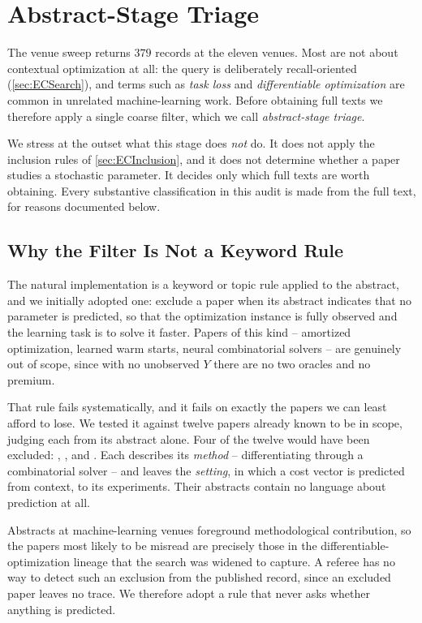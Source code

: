 \section{Abstract-Stage Triage}
\label{sec:ECTriage}

The venue sweep returns \(379\) records at the eleven venues. Most are not about contextual
optimization at all: the query is deliberately recall-oriented (\cref{sec:ECSearch}), and terms such
as \emph{task loss} and \emph{differentiable optimization} are common in unrelated machine-learning
work. Before obtaining full texts we therefore apply a single coarse filter, which we call
\emph{abstract-stage triage}.

We stress at the outset what this stage does \emph{not} do. It does not apply the inclusion rules of
\cref{sec:ECInclusion}, and it does not determine whether a paper studies a stochastic parameter. It
decides only which full texts are worth obtaining. Every substantive classification in this audit is
made from the full text, for reasons documented below.

\subsection{Why the Filter Is Not a Keyword Rule}

The natural implementation is a keyword or topic rule applied to the abstract, and we initially
adopted one: exclude a paper when its abstract indicates that no parameter is predicted, so that the
optimization instance is fully observed and the learning task is to solve it faster. Papers of this
kind -- amortized optimization, learned warm starts, neural combinatorial solvers -- are genuinely
out of scope, since with no unobserved \(Y\) there are no two oracles and no premium.

That rule fails systematically, and it fails on exactly the papers we can least afford to lose. We
tested it against twelve papers already known to be in scope, judging each from its abstract alone.
Four of the twelve would have been excluded: \citet{berthet2020learning},
\citet{poganvcic2020differentiation}, \citet{sahoo2023backpropagation} and
\citet{niepert2021implicit}. Each describes its
\emph{method} -- differentiating through a combinatorial solver -- and leaves the \emph{setting}, in
which a cost vector is predicted from context, to its experiments. Their abstracts contain no
language about prediction at all.

Abstracts at machine-learning venues foreground methodological contribution, so the papers most
likely to be misread are precisely those in the differentiable-optimization lineage that the search
was widened to capture. A referee has no way to
detect such an exclusion from the published record, since an excluded paper leaves no trace. We
therefore adopt a rule that never asks whether anything is predicted.

